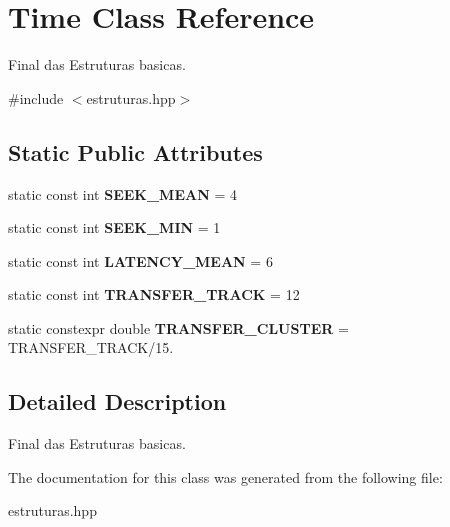 \hypertarget{classTime}{}\section{Time Class Reference}
\label{classTime}


Final das Estruturas basicas.  




{\ttfamily \#include $<$estruturas.\+hpp$>$}

\subsection*{Static Public Attributes}
\begin{DoxyCompactItemize}
\item 
static const int {\bfseries S\+E\+E\+K\+\_\+\+M\+E\+AN} = 4\hypertarget{classTime_a3977bad6b54ae3a1600d73060251e22f}{}\label{classTime_a3977bad6b54ae3a1600d73060251e22f}

\item 
static const int {\bfseries S\+E\+E\+K\+\_\+\+M\+IN} = 1\hypertarget{classTime_a4d62bba8f4c6647a754aa164298d867c}{}\label{classTime_a4d62bba8f4c6647a754aa164298d867c}

\item 
static const int {\bfseries L\+A\+T\+E\+N\+C\+Y\+\_\+\+M\+E\+AN} = 6\hypertarget{classTime_a2e49c1935993babc40df360de53664b2}{}\label{classTime_a2e49c1935993babc40df360de53664b2}

\item 
static const int {\bfseries T\+R\+A\+N\+S\+F\+E\+R\+\_\+\+T\+R\+A\+CK} = 12\hypertarget{classTime_a6780787c8246709d2c43567915262518}{}\label{classTime_a6780787c8246709d2c43567915262518}

\item 
static constexpr double {\bfseries T\+R\+A\+N\+S\+F\+E\+R\+\_\+\+C\+L\+U\+S\+T\+ER} = T\+R\+A\+N\+S\+F\+E\+R\+\_\+\+T\+R\+A\+CK/15.\hypertarget{classTime_a96badaf914d28009d79858081b049d6f}{}\label{classTime_a96badaf914d28009d79858081b049d6f}

\end{DoxyCompactItemize}


\subsection{Detailed Description}
Final das Estruturas basicas. 

The documentation for this class was generated from the following file\+:\begin{DoxyCompactItemize}
\item 
estruturas.\+hpp\end{DoxyCompactItemize}
